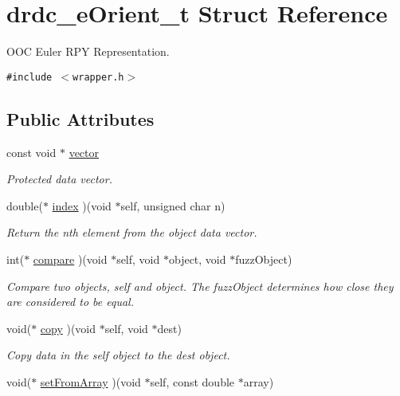 \hypertarget{structdrdc__eOrient__t}{
\section{drdc\_\-eOrient\_\-t Struct Reference}
\label{structdrdc__eOrient__t}
}
OOC Euler RPY Representation.  


{\tt \#include $<$wrapper.h$>$}

\subsection*{Public Attributes}
\begin{CompactItemize}
\item 
const void $\ast$ \hyperlink{structdrdc__eOrient__t_f2af5b645f5c1ca1629335cf5d9f3e5e}{vector}
\begin{CompactList}\small\item\em Protected data vector. \item\end{CompactList}\item 
double($\ast$ \hyperlink{structdrdc__eOrient__t_d59e483e9439f6fdfa6815f55fb5ee98}{index} )(void $\ast$self, unsigned char n)
\begin{CompactList}\small\item\em Return the nth element from the object data vector. \item\end{CompactList}\item 
int($\ast$ \hyperlink{structdrdc__eOrient__t_43134125625a557e14154ecf72520924}{compare} )(void $\ast$self, void $\ast$object, void $\ast$fuzzObject)
\begin{CompactList}\small\item\em Compare two objects, self and object. The fuzzObject determines how close they are considered to be equal. \item\end{CompactList}\item 
void($\ast$ \hyperlink{structdrdc__eOrient__t_1cf0f5c59d1a97bfa330155dccaa7470}{copy} )(void $\ast$self, void $\ast$dest)
\begin{CompactList}\small\item\em Copy data in the self object to the dest object. \item\end{CompactList}\item 
void($\ast$ \hyperlink{structdrdc__eOrient__t_4b1ac90f5adeaf67720d8d8c6525cdaa}{setFromArray} )(void $\ast$self, const double $\ast$array)

\end{CompactItemize}
